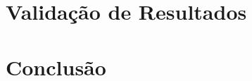 \documentclass[a4paper,11pt,openright,oneside]{report}
\begin{document}
\section{Validação de Resultados}
\label{sec:validação}



\section{Conclusão}
\label{sec:conclusão}

\maketitle
\nocite{*}
\end{document}
